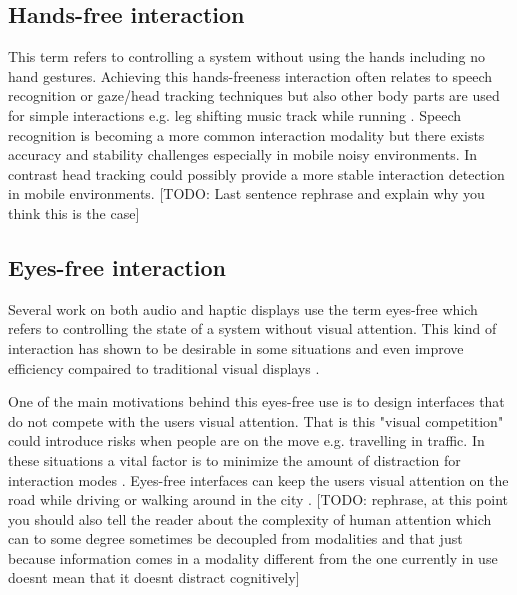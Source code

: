 \subsection{Hands-free interaction}
This term refers to controlling a system without using the hands including no hand gestures. Achieving this hands-freeness interaction often relates to speech recognition or gaze/head tracking techniques but also other body parts are used for simple interactions e.g. leg shifting music track while running \cite{smus_running_2010}. Speech recognition is becoming a more common interaction modality but there exists accuracy and stability challenges especially in mobile noisy environments. In contrast head tracking could possibly provide a more stable interaction detection in mobile environments. [TODO: Last sentence rephrase and explain why you think this is the case]

\subsection{Eyes-free interaction}
Several work on both audio \cite{kajastila_eyes-free_2013,bonner_no-look_2010,brewster_multimodaleyes-freeinteraction_2003,zhao_earpod:_2007,vazquez-alvarez_eyes-free_2011} and haptic \cite{pasquero_haptic_2011,pielot_tactile_2011} displays use the term eyes-free which refers to controlling the state of a system without visual attention. This kind of interaction has shown to be desirable in some situations \cite{oakley_designing_2007,yi_exploring_2012} and even improve efficiency compaired to traditional visual displays \cite{zhao_earpod:_2007}.

One of the main motivations behind this eyes-free use is to design interfaces that do not compete with the users visual attention. That is this "visual competition" could introduce risks when people are on the move e.g. travelling in traffic. In these situations a vital factor is to minimize the amount of distraction for interaction modes \cite{pascoe_using_2000}. Eyes-free interfaces can keep the users visual attention on the road while driving \cite{sodnik_user_2008} or walking around in the city \cite{vazquez-alvarez_eyes-free_2011}. [TODO: rephrase, at this point you should also tell the reader about the complexity of human attention which can to some degree sometimes be decoupled from modalities and that just because information comes in a modality different from the one currently in use doesnt mean that it doesnt distract cognitively]

